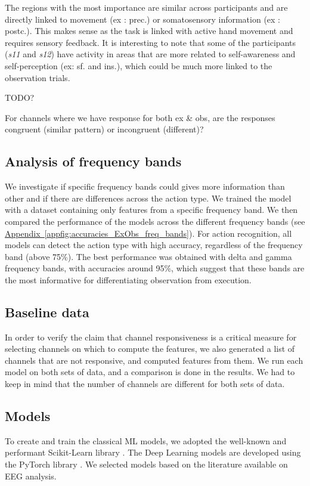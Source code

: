 \documentclass[10pt,conference,compsocconf]{IEEEtran}
\newcommand{\aref}[1]{\hyperref[#1]{Appendix~\ref*{#1}}}
\begin{document}
The regions with the most importance are similar across participants and are directly linked to movement (ex : prec.) or somatosensory information (ex : postc.). This makes sense as the task is linked with active hand movement and requires sensory feedback. It is interesting to note that some of the participants (\textit{s11} and \textit{s12}) have activity in areas that are more related to self-awareness and self-perception (ex: sf. and ins.), which could be much more linked to the observation trials.

TODO?

For channels where we have response for both ex \& obs, are the responses congruent (similar pattern) or incongruent (different)?

\subsection{Analysis of frequency bands}
We investigate if specific frequency bands could gives more information than other and if there are differences across the action type. We trained the model with a dataset containing only features from a specific frequency band. We then compared the performance of the models across the different frequency bands (see \aref{appfig:accuracies_ExObs_freq_bands}). For action recognition, all models can detect the action type with high accuracy, regardless of the frequency band (above 75\%). The best performance was obtained with delta and gamma frequency bands, with accuracies around 95\%, which suggest that these bands are the most informative for differentiating observation from execution.

\subsection{Baseline data}
In order to verify the claim that channel responsiveness is a critical measure for selecting channels on which to compute the features, we also generated a list of channels that are not responsive, and computed features from them. We run each model on both sets of data, and a comparison is done in the results. We had to keep in mind that the number of channels are different for both sets of data.

\subsection{Models}
To create and train the classical ML models, we adopted the well-known and performant Scikit-Learn library \cite{scikitlearn}. The Deep Learning models are developed using the PyTorch library \cite{pytorch}. We selected models based on the literature available on EEG analysis.
\end{document}
